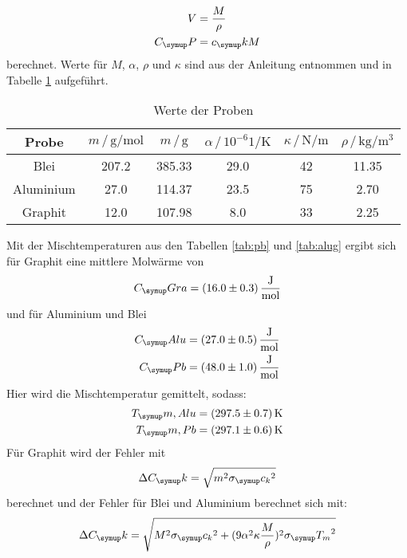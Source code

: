 \begin{align*}
  V&=\frac{M}{\rho}\\
  C_\su{P} &= c_\su{k}M
\end{align*}
berechnet. Werte für $M$, $\alpha$, $\rho$ und $\kappa$ sind aus der Anleitung
\cite{201} entnommen und in Tabelle \ref{tab:mol} aufgeführt.
\begin{table}
  \centering
  \begin{tabular}{c | c c c c c}
    \toprule
    Probe & $m\,/\,\si{\gram\per\mol}$&$m\,/\,\si{\gram}$ &$\alpha\,/\,10^{-6}\si{1\per\kelvin}$
    &$\kappa\,/\,\si{\newton\per\meter}$&$\rho\,/\,\si{\kilo\gram\per\cubic
    \meter}$ \\
    \midrule
    Blei      & 207.2 & 385.33 & 29.0 & 42 & 11.35 \\
    Aluminium &  27.0 & 114.37 & 23.5 & 75 &  2.70 \\
    Graphit   &  12.0 & 107.98 &  8.0 & 33 &  2.25 \\
    \bottomrule
  \end{tabular}
  \caption{Werte der Proben}
  \label{tab:mol}
\end{table}
Mit der Mischtemperaturen aus den Tabellen \ref{tab:pb} und \ref{tab:alug}
ergibt sich für Graphit eine mittlere Molwärme von
\begin{equation*}
  C_\su{Gra}= (16.0\pm0.3)\,\si{\joule\per\mol}
\end{equation*}
und für Aluminium und Blei
\begin{align*}
  C_\su{Alu} &= (27.0\pm0.5)\,\si{\joule\per\mol} \\
  C_\su{Pb} &= (48.0\pm1.0)\,\si{\joule\per\mol}
\end{align*}
Hier wird die Mischtemperatur gemittelt, sodass:
\begin{align*}
  T_\su{m, Alu} &= (297.5\pm0.7)\Kel \\
  T_\su{m, Pb}  &= (297.1\pm0.6)\Kel
\end{align*}
Für Graphit wird der Fehler mit
\begin{equation*}
  \Delta C_\su{k}=\sqrt{m^2\sigma_\su{c_k}^2}
\end{equation*}
berechnet und der Fehler für Blei und Aluminium berechnet sich mit:
\begin{equation*}
  \Delta C_\su{k}=\sqrt{M^2\sigma_\su{c_k}^2+(9\alpha^2\kappa\frac{M}{\rho})^2
  \sigma_\su{T_m}^2}
\end{equation*}
